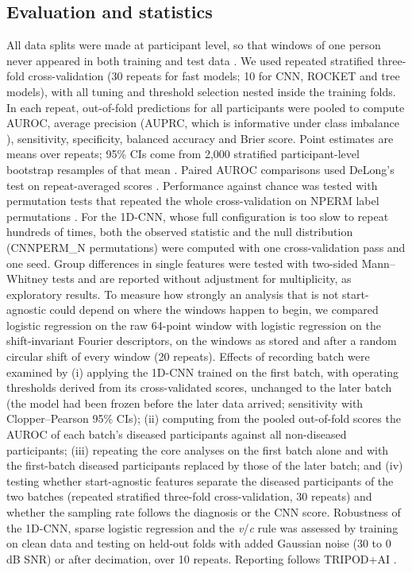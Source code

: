 \documentclass[11pt]{article}
\begin{document}
\subsection*{Evaluation and statistics}
All data splits were made at participant level, so that windows of one person never appeared in both training and test data \cite{saeb2017need,kapoor2023leakage}. We used repeated stratified three-fold cross-validation (30 repeats for fast models; 10 for CNN, ROCKET and tree models), with all tuning and threshold selection nested inside the training folds. In each repeat, out-of-fold predictions for all participants were pooled to compute AUROC, average precision (AUPRC, which is informative under class imbalance \cite{saito2015precision}), sensitivity, specificity, balanced accuracy and Brier score. Point estimates are means over repeats; 95\% CIs come from 2,000 stratified participant-level bootstrap resamples of that mean \cite{efron1979bootstrap,efron1993introduction}. Paired AUROC comparisons used DeLong's test on repeat-averaged scores \cite{delong1988comparing}. Performance against chance was tested with permutation tests that repeated the whole cross-validation on {{NPERM}} label permutations \cite{ojala2010permutation}. For the 1D-CNN, whose full configuration is too slow to repeat hundreds of times, both the observed statistic and the null distribution ({{CNNPERM_N}} permutations) were computed with one cross-validation pass and one seed. Group differences in single features were tested with two-sided Mann--Whitney tests and are reported without adjustment for multiplicity, as exploratory results. To measure how strongly an analysis that is not start-agnostic could depend on where the windows happen to begin, we compared logistic regression on the raw 64-point window with logistic regression on the shift-invariant Fourier descriptors, on the windows as stored and after a random circular shift of every window (20 repeats). Effects of recording batch were examined by (i) applying the 1D-CNN trained on the first batch, with operating thresholds derived from its cross-validated scores, unchanged to the later batch (the model had been frozen before the later data arrived; sensitivity with Clopper--Pearson 95\% CIs); (ii) computing from the pooled out-of-fold scores the AUROC of each batch's diseased participants against all non-diseased participants; (iii) repeating the core analyses on the first batch alone and with the first-batch diseased participants replaced by those of the later batch; and (iv) testing whether start-agnostic features separate the diseased participants of the two batches (repeated stratified three-fold cross-validation, 30 repeats) and whether the sampling rate follows the diagnosis or the CNN score. Robustness of the 1D-CNN, sparse logistic regression and the \textit{v}/\textit{c} rule was assessed by training on clean data and testing on held-out folds with added Gaussian noise (30 to 0\,dB SNR) or after decimation, over 10 repeats. Reporting follows TRIPOD+AI \cite{collins2024tripod}.
\end{document}
